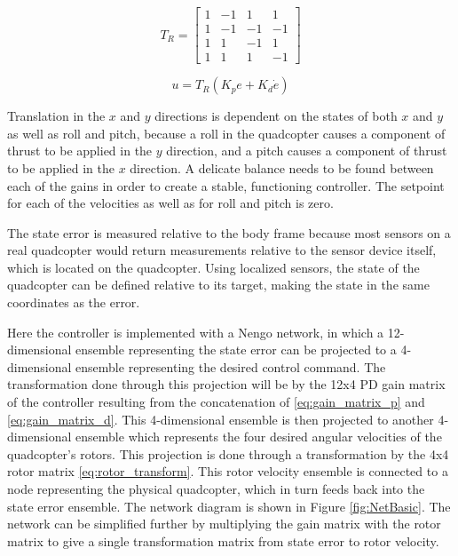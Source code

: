 \documentclass[letterpaper, 10 pt, conference]{ieeeconf}  %
\begin{document}
\begin{equation} \label{eq:rotor_transform}
T_{R} = 
\begin{bmatrix}
1 & -1 & 1 & 1 \\
1 & -1 & -1 & -1 \\
1 & 1 & -1 & 1 \\
1 & 1 & 1 & -1
\end{bmatrix}
\end{equation}

\begin{equation} \label{eq:control_equation}
u = T_{R}(K_{p}e + K_{d}\dot{e})
\end{equation}

Translation in the $x$ and $y$ directions is dependent on the states of both $x$ and $y$ as well as roll and pitch, because a roll in the quadcopter causes a component of thrust to be applied in the $y$ direction, and a pitch causes a component of thrust to be applied in the $x$ direction.
A delicate balance needs to be found between each of the gains in order to create a stable, functioning controller. 
The setpoint for each of the velocities as well as for roll and pitch is zero.

The state error is measured relative to the body frame because most sensors on a real quadcopter would return measurements relative to the sensor device itself, which is located on the quadcopter. Using localized sensors, the state of the quadcopter can be defined relative to its target, making the state in the same coordinates as the error.

Here the controller is implemented with a Nengo network, in which a 12-dimensional ensemble representing the state error can be projected to a 4-dimensional ensemble representing the desired control command. 
The transformation done through this projection will be by the 12x4 PD gain matrix of the controller resulting from the concatenation of \eqref{eq:gain_matrix_p} and \eqref{eq:gain_matrix_d}. 
This 4-dimensional ensemble is then projected to another 4-dimensional ensemble which represents the four desired angular velocities of the quadcopter's rotors. 
This projection is done through a transformation by the 4x4 rotor matrix \eqref{eq:rotor_transform}. 
This rotor velocity ensemble is connected to a node representing the physical quadcopter, which in turn feeds back into the state error ensemble. 
The network diagram is shown in Figure \ref{fig:NetBasic}. 
The network can be simplified further by multiplying the gain matrix with the rotor matrix to give a single transformation matrix from state error to rotor velocity. 
\end{document}
